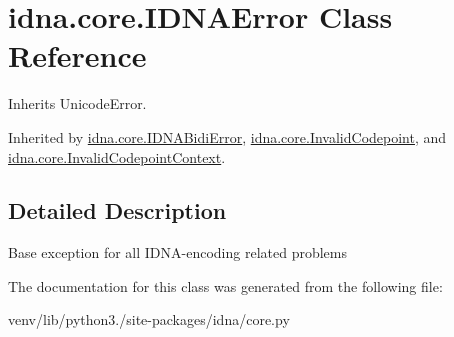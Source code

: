\hypertarget{classidna_1_1core_1_1_i_d_n_a_error}{}\section{idna.\+core.\+I\+D\+N\+A\+Error Class Reference}
\label{classidna_1_1core_1_1_i_d_n_a_error}


Inherits Unicode\+Error.



Inherited by \hyperlink{classidna_1_1core_1_1_i_d_n_a_bidi_error}{idna.\+core.\+I\+D\+N\+A\+Bidi\+Error}, \hyperlink{classidna_1_1core_1_1_invalid_codepoint}{idna.\+core.\+Invalid\+Codepoint}, and \hyperlink{classidna_1_1core_1_1_invalid_codepoint_context}{idna.\+core.\+Invalid\+Codepoint\+Context}.



\subsection{Detailed Description}
\begin{DoxyVerb}Base exception for all IDNA-encoding related problems \end{DoxyVerb}
 

The documentation for this class was generated from the following file\+:\begin{DoxyCompactItemize}
\item 
venv/lib/python3./site-\/packages/idna/core.\+py\end{DoxyCompactItemize}
